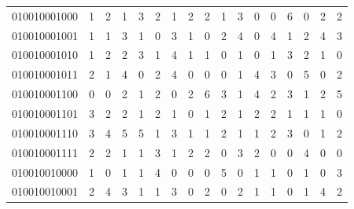 \documentclass[10pt,a4paper]{article}
\begin{document}
\begin{longtable}{ |c|c|c|c|c|c|c|c|c|c|c|c|c|c|c|c|c| }
    010010001000              & 1                            & 2                                & 1                            & 3                              & 2   & 1   & 2   & 2   & 1   & 3   & 0   & 0   & 6   & 0   & 2   & 2   \\
    010010001001              & 1                            & 1                                & 3                            & 1                              & 0   & 3   & 1   & 0   & 2   & 4   & 0   & 4   & 1   & 2   & 4   & 3   \\
    010010001010              & 1                            & 2                                & 2                            & 3                              & 1   & 4   & 1   & 1   & 0   & 1   & 0   & 1   & 3   & 2   & 1   & 0   \\
    010010001011              & 2                            & 1                                & 4                            & 0                              & 2   & 4   & 0   & 0   & 0   & 1   & 4   & 3   & 0   & 5   & 0   & 2   \\
    010010001100              & 0                            & 0                                & 2                            & 1                              & 2   & 0   & 2   & 6   & 3   & 1   & 4   & 2   & 3   & 1   & 2   & 5   \\
    010010001101              & 3                            & 2                                & 2                            & 1                              & 2   & 1   & 0   & 1   & 2   & 1   & 2   & 2   & 1   & 1   & 1   & 0   \\
    010010001110              & 3                            & 4                                & 5                            & 5                              & 1   & 3   & 1   & 1   & 2   & 1   & 1   & 2   & 3   & 0   & 1   & 2   \\
    010010001111              & 2                            & 2                                & 1                            & 1                              & 3   & 1   & 2   & 2   & 0   & 3   & 2   & 0   & 0   & 4   & 0   & 0   \\
    010010010000              & 1                            & 0                                & 1                            & 1                              & 4   & 0   & 0   & 0   & 5   & 0   & 1   & 1   & 0   & 1   & 0   & 3   \\
    010010010001              & 2                            & 4                                & 3                            & 1                              & 1   & 3   & 0   & 2   & 0   & 2   & 1   & 1   & 0   & 1   & 4   & 2   \\

\end{longtable}
\end{document}
